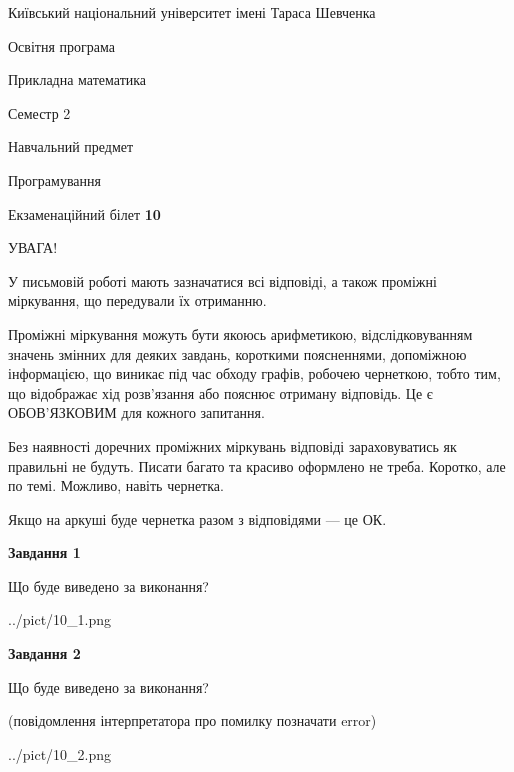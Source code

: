 \documentclass[12pt, ukrainian]{article}
\begin{document}
{{\begin {small}\par
{ \center  Київський національний університет імені Тараса Шевченка \par}
{\parbox {5 cm}{Освітня програма \hfill}{\parbox {7 cm}{Прикладна математика\hfill}}\parbox {6 cm}{\hfill Семестр 2}}\par
{\parbox {5 cm} {Навчальний предмет \hfill}\parbox {7 cm}{Програмування \hfill}\parbox {6cm}{\hfill}\par}\vspace{-7pt} \end{small}}{\center Екзаменаційний білет \No \textbf
{ 10 }\par}}
{
\begin {large}
УВАГА!

У письмовій роботі мають зазначатися всі відповіді, а також проміжні міркування, що передували їх отриманню.

Проміжні міркування можуть бути якоюсь арифметикою, відслідковуванням зна\-чень змінних для деяких завдань,
короткими поясненнями, допоміжною інформацією, що виникає під час обходу графів, робочею чернеткою,
тобто тим, що відображає хід розв’язання або пояснює отриману відповідь.
Це є ОБОВ’ЯЗКОВИМ для кожного запитання.

Без наявності доречних проміжних міркувань відповіді зараховуватись як правиль\-ні не будуть.
Писати багато та красиво оформлено не треба. Коротко, але по темі. Можли\-во, навіть чернетка.

Якщо на аркуші буде чернетка разом з відповідями --- це ОК.

\newpage

{\begin {center}\textbf{Завдання 1}\end {center}}\par
Що буде виведено за виконання?\par
\begin{center}
	{../pict/10_1.png}
\end{center}
\newpage

{\begin {center}\textbf{Завдання 2}\end {center}}\par
Що буде виведено за виконання?\par
 (повідомлення інтерпретатора про помилку позначати error)\par
\begin{center}
	{../pict/10_2.png}
\end{center}
\newpage


\end{large}}
\end{document}
